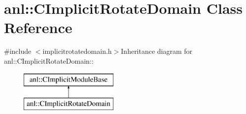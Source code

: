 \hypertarget{classanl_1_1CImplicitRotateDomain}{
\section{anl::CImplicitRotateDomain Class Reference}
\label{classanl_1_1CImplicitRotateDomain}
}


{\ttfamily \#include $<$implicitrotatedomain.h$>$}Inheritance diagram for anl::CImplicitRotateDomain::\begin{figure}[H]
\begin{center}
\leavevmode
\includegraphics[height=2cm]{classanl_1_1CImplicitRotateDomain}
\end{center}
\end{figure}
